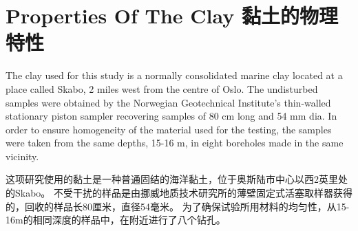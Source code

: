 \section{Properties Of The Clay 黏土的物理特性}

\begin{paracol}{2}

    The clay used for this study is a normally consolidated marine clay located at a place called Skabo, 2 miles west from the centre of Oslo. The undisturbed samples were obtained by the Norwegian Geotechnical Institute's thin-walled stationary piston sampler recovering samples of 80 cm long and 54 mm dia. In order to ensure homogeneity of the material used for the testing, the samples were taken from the same depths, 15-16 m, in eight boreholes made in the same vicinity.

    \switchcolumn

    这项研究使用的黏土是一种普通固结的海洋黏土，位于奥斯陆市中心以西2英里处的Skabo。 不受干扰的样品是由挪威地质技术研究所的薄壁固定式活塞取样器获得的，回收的样品长80厘米，直径54毫米。 为了确保试验所用材料的均匀性，从15-16m的相同深度的样品中，在附近进行了八个钻孔。

\end{paracol}



